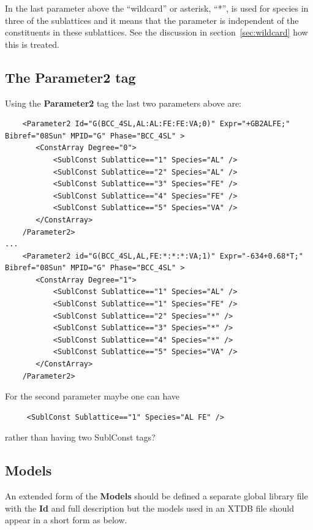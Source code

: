 \documentclass{article}
\begin{document}
\begin{appendices}
In the last parameter above the ``wildcard'' or asterisk, ``*'', is
used for species in three of the sublattices and it means that the
parameter is independent of the constituents in these sublattices.
See the discussion in section~\ref{sec:wildcard} how this is treated.


\subsection{The Parameter2 tag}

Using the {\bf Parameter2} tag the last two parameters above are:

{\small
\begin{verbatim}
    <Parameter2 Id="G(BCC_4SL,AL:AL:FE:FE:VA;0)" Expr="+GB2ALFE;" Bibref="08Sun" MPID="G" Phase="BCC_4SL" >
       <ConstArray Degree="0">
           <SublConst Sublattice=="1" Species="AL" />
           <SublConst Sublattice=="2" Species="AL" />
           <SublConst Sublattice=="3" Species="FE" />
           <SublConst Sublattice=="4" Species="FE" />
           <SublConst Sublattice=="5" Species="VA" />
       </ConstArray>
    /Parameter2>
...
    <Parameter2 id="G(BCC_4SL,AL,FE:*:*:*:VA;1)" Expr="-634+0.68*T;" Bibref="08Sun" MPID="G" Phase="BCC_4SL" >
       <ConstArray Degree="1">
           <SublConst Sublattice=="1" Species="AL" />
           <SublConst Sublattice=="1" Species="FE" />
           <SublConst Sublattice=="2" Species="*" />
           <SublConst Sublattice=="3" Species="*" />
           <SublConst Sublattice=="4" Species="*" />
           <SublConst Sublattice=="5" Species="VA" />
       </ConstArray>
    /Parameter2>
\end{verbatim}
}

For the second parameter maybe one can have

{\small
\begin{verbatim}
     <SublConst Sublattice=="1" Species="AL FE" />
\end{verbatim}
}

rather than having two SublConst tags?

\newpage 

\subsection{Models}\label{sec:modelex}

An extended form of the {\bf Models} should be defined a separate
global library file with the {\bf Id} and full description but the
models used in an XTDB file should appear in a short form as below.


\end{appendices}
\end{document}
